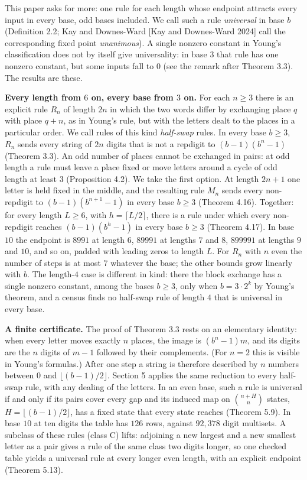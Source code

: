 \documentclass[11pt,letterpaper]{article}
\theoremstyle{paperstyle}
\theoremstyle{paperstyledef}
\theoremstyle{paperstylerem}
\begin{document}
This paper asks for more: one rule for each length whose endpoint attracts every input in every base, odd bases included. We call such a rule \emph{universal} in base \(b\) (Definition 2.2; Kay and Downes-Ward {[}Kay and Downes-Ward 2024{]} call the corresponding fixed point \emph{unanimous}). A single nonzero constant in Young's classification does not by itself give universality: in base \(3\) that rule has one nonzero constant, but some inputs fall to \(0\) (see the remark after Theorem 3.3). The results are these.

\textbf{Every length from \(6\) on, every base from \(3\) on.} For each \(n \geq 3\) there is an explicit rule \(R_n\) of length \(2n\) in which the two words differ by exchanging place \(q\) with place \(q + n\), as in Young's rule, but with the letters dealt to the places in a particular order. We call rules of this kind \emph{half-swap} rules. In every base \(b \geq 3\), \(R_n\) sends every string of \(2n\) digits that is not a repdigit to \((b-1)(b^n - 1)\) (Theorem 3.3). An odd number of places cannot be exchanged in pairs: at odd length a rule must leave a place fixed or move letters around a cycle of odd length at least \(3\) (Proposition 4.2). We take the first option. At length \(2n+1\) one letter is held fixed in the middle, and the resulting rule \(M_n\) sends every non-repdigit to \((b-1)(b^{n+1}-1)\) in every base \(b \geq 3\) (Theorem 4.16). Together: for every length \(L \geq 6\), with \(h = \lceil L/2 \rceil\), there is a rule under which every non-repdigit reaches \((b-1)(b^h - 1)\) in every base \(b \geq 3\) (Theorem 4.17). In base \(10\) the endpoint is \(8991\) at length \(6\), \(89991\) at lengths \(7\) and \(8\), \(899991\) at lengths \(9\) and \(10\), and so on, padded with leading zeros to length \(L\). For \(R_n\) with \(n\) even the number of steps is at most \(7\) whatever the base; the other bounds grow linearly with \(b\). The length-\(4\) case is different in kind: there the block exchange has a single nonzero constant, among the bases \(b \geq 3\), only when \(b = 3 \cdot 2^k\) by Young's theorem, and a census finds no half-swap rule of length \(4\) that is universal in every base.

\textbf{A finite certificate.} The proof of Theorem 3.3 rests on an elementary identity: when every letter moves exactly \(n\) places, the image is \((b^n - 1)m\), and its digits are the \(n\) digits of \(m - 1\) followed by their complements. (For \(n = 2\) this is visible in Young's formulas.) After one step a string is therefore described by \(n\) numbers between \(0\) and \(\lfloor (b-1)/2 \rfloor\). Section 5 applies the same reduction to every half-swap rule, with any dealing of the letters. In an even base, such a rule is universal if and only if its pairs cover every gap and its induced map on \(\binom{n+H}{n}\) states, \(H = \lfloor (b-1)/2 \rfloor\), has a fixed state that every state reaches (Theorem 5.9). In base \(10\) at ten digits the table has \(126\) rows, against \(92{,}378\) digit multisets. A subclass of these rules (class C) lifts: adjoining a new largest and a new smallest letter as a pair gives a rule of the same class two digits longer, so one checked table yields a universal rule at every longer even length, with an explicit endpoint (Theorem 5.13).
\end{document}
